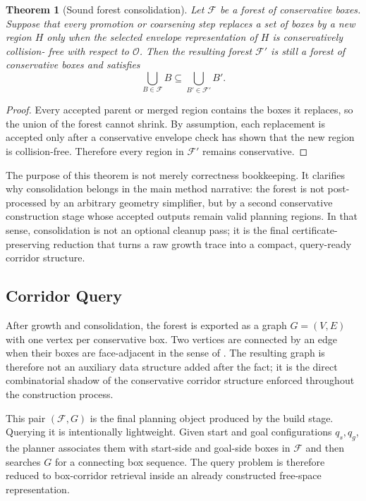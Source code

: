 \documentclass[journal]{IEEEtran}
\newtheorem{theorem}{Theorem}
\newcommand{\calO}{\ensuremath{\mathcal{O}}}
\begin{document}
\begin{theorem}[Sound forest consolidation]
\label{thm:forest_consolidation}
Let $\mathcal{F}$ be a forest of conservative boxes. Suppose that every promotion
or coarsening step replaces a set of boxes by a new region $H$ only when the
selected envelope representation of $H$ is conservatively collision-
free with respect to $\calO$. Then the resulting forest
$\mathcal{F}'$ is still a forest of conservative boxes and satisfies
\[
\bigcup_{B\in\mathcal{F}} B \subseteq \bigcup_{B'\in\mathcal{F}'} B'.
\]
\end{theorem}

\begin{proof}
Every accepted parent or merged region contains the boxes it replaces, so the
union of the forest cannot shrink. By assumption, each replacement is accepted
only after a conservative envelope check has shown that the new region is
collision-free. Therefore every region in $\mathcal{F}'$ remains conservative.
\end{proof}

The purpose of this theorem is not merely correctness bookkeeping. It clarifies
why consolidation belongs in the main method narrative: the forest is not
post-processed by an arbitrary geometry simplifier, but by a second conservative
construction stage whose accepted outputs remain valid planning regions. In
that sense, consolidation is not an optional cleanup pass; it is the final
certificate-preserving reduction that turns a raw growth trace into a compact,
query-ready corridor structure.

\subsection{Corridor Query}
\label{sec:forest_graph}

After growth and consolidation, the forest is exported as a graph
$G=(V,E)$ with one vertex per conservative box. Two vertices are connected by an
edge when their boxes are face-adjacent in the sense of
. The resulting graph is therefore not an auxiliary
data structure added after the fact; it is the direct combinatorial shadow of
the conservative corridor structure enforced throughout the construction process.

This pair $(\mathcal{F},G)$ is the final planning object produced by the build
stage. Querying it is intentionally lightweight. Given start and goal
configurations $q_s,q_g$, the planner associates them with start-side and
goal-side boxes in $\mathcal{F}$ and then searches $G$ for a connecting box
sequence. The query problem is therefore reduced to box-corridor
retrieval inside an already constructed free-space representation.
\end{document}
